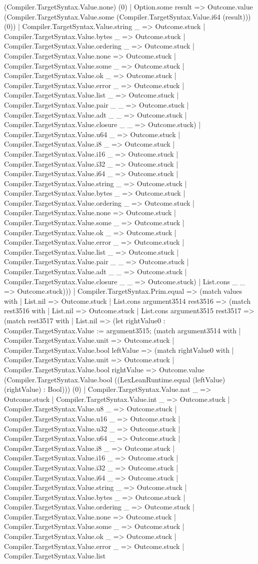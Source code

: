 \documentclass[11pt]{article}
\begin{document}
(Compiler.TargetSyntax.Value.none) (0) | Option.some result => Outcome.value (Compiler.TargetSyntax.Value.some (Compiler.TargetSyntax.Value.i64 (result))) (0)) | Compiler.TargetSyntax.Value.string \_ => Outcome.stuck | Compiler.TargetSyntax.Value.bytes \_ => Outcome.stuck | Compiler.TargetSyntax.Value.ordering \_ => Outcome.stuck | Compiler.TargetSyntax.Value.none => Outcome.stuck | Compiler.TargetSyntax.Value.some \_ => Outcome.stuck | Compiler.TargetSyntax.Value.ok \_ => Outcome.stuck | Compiler.TargetSyntax.Value.error \_ => Outcome.stuck | Compiler.TargetSyntax.Value.list \_ => Outcome.stuck | Compiler.TargetSyntax.Value.pair \_ \_ => Outcome.stuck | Compiler.TargetSyntax.Value.adt \_ \_ => Outcome.stuck | Compiler.TargetSyntax.Value.closure \_ \_ => Outcome.stuck) | Compiler.TargetSyntax.Value.u64 \_ => Outcome.stuck | Compiler.TargetSyntax.Value.i8 \_ => Outcome.stuck | Compiler.TargetSyntax.Value.i16 \_ => Outcome.stuck | Compiler.TargetSyntax.Value.i32 \_ => Outcome.stuck | Compiler.TargetSyntax.Value.i64 \_ => Outcome.stuck | Compiler.TargetSyntax.Value.string \_ => Outcome.stuck | Compiler.TargetSyntax.Value.bytes \_ => Outcome.stuck | Compiler.TargetSyntax.Value.ordering \_ => Outcome.stuck | Compiler.TargetSyntax.Value.none => Outcome.stuck | Compiler.TargetSyntax.Value.some \_ => Outcome.stuck | Compiler.TargetSyntax.Value.ok \_ => Outcome.stuck | Compiler.TargetSyntax.Value.error \_ => Outcome.stuck | Compiler.TargetSyntax.Value.list \_ => Outcome.stuck | Compiler.TargetSyntax.Value.pair \_ \_ => Outcome.stuck | Compiler.TargetSyntax.Value.adt \_ \_ => Outcome.stuck | Compiler.TargetSyntax.Value.closure \_ \_ => Outcome.stuck) | List.cons \_ \_ => Outcome.stuck))) | Compiler.TargetSyntax.Prim.equal => (match values with | List.nil => Outcome.stuck | List.cons argument3514 rest3516 => (match rest3516 with | List.nil => Outcome.stuck | List.cons argument3515 rest3517 => (match rest3517 with | List.nil => (let rightValue0 : Compiler.TargetSyntax.Value := argument3515; (match argument3514 with | Compiler.TargetSyntax.Value.unit => Outcome.stuck | Compiler.TargetSyntax.Value.bool leftValue => (match rightValue0 with | Compiler.TargetSyntax.Value.unit => Outcome.stuck | Compiler.TargetSyntax.Value.bool rightValue => Outcome.value (Compiler.TargetSyntax.Value.bool ((LexLeanRuntime.equal (leftValue) (rightValue) : Bool))) (0) | Compiler.TargetSyntax.Value.nat \_ => Outcome.stuck | Compiler.TargetSyntax.Value.int \_ => Outcome.stuck | Compiler.TargetSyntax.Value.u8 \_ => Outcome.stuck | Compiler.TargetSyntax.Value.u16 \_ => Outcome.stuck | Compiler.TargetSyntax.Value.u32 \_ => Outcome.stuck | Compiler.TargetSyntax.Value.u64 \_ => Outcome.stuck | Compiler.TargetSyntax.Value.i8 \_ => Outcome.stuck | Compiler.TargetSyntax.Value.i16 \_ => Outcome.stuck | Compiler.TargetSyntax.Value.i32 \_ => Outcome.stuck | Compiler.TargetSyntax.Value.i64 \_ => Outcome.stuck | Compiler.TargetSyntax.Value.string \_ => Outcome.stuck | Compiler.TargetSyntax.Value.bytes \_ => Outcome.stuck | Compiler.TargetSyntax.Value.ordering \_ => Outcome.stuck | Compiler.TargetSyntax.Value.none => Outcome.stuck | Compiler.TargetSyntax.Value.some \_ => Outcome.stuck | Compiler.TargetSyntax.Value.ok \_ => Outcome.stuck | Compiler.TargetSyntax.Value.error \_ => Outcome.stuck | Compiler.TargetSyntax.Value.list 
\end{document}
